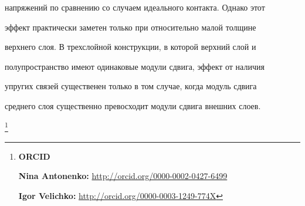 напряжений по сравнению со случаем идеального контакта. Однако этот

эффект практически заметен только при относительно малой толщине

верхнего слоя. В трехслойной конструкции, в которой верхний слой и

полупространство имеют одинаковые модули сдвига, эффект от наличия

упругих связей существенен только в том случае, когда модуль сдвига

среднего слоя существенно превосходит модули сдвига внешних слоев.





\newpage



\thanks{{\bf ORCID}



{\bf Nina Antonenko:} \url{http://orcid.org/0000-0002-0427-6499}



{\bf Igor Velichko:} \url{http://orcid.org/0000-0003-1249-774X}



}









\RusRef





